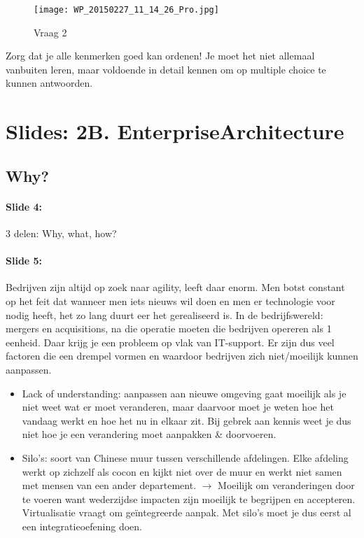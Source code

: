 \documentclass[10pt,a4paper]{report}
\begin{document}
\begin{figure}[ht!]
\centering
\texttt{[image: WP\_20150227\_11\_14\_26\_Pro.jpg]}
\caption{Vraag 2 \label{pop_Vraag 2}}
\end{figure}

Zorg dat je alle kenmerken goed kan ordenen! Je moet het niet allemaal vanbuiten leren, maar voldoende in detail kennen om op multiple choice te kunnen antwoorden. 

\section{Slides: 2B. EnterpriseArchitecture}
\subsection{Why?}
\paragraph{Slide 4:}3 delen: Why, what, how?

\paragraph{Slide 5:}Bedrijven zijn altijd op zoek naar agility, leeft daar enorm. Men botst constant op het feit dat wanneer men iets nieuws wil doen en men er technologie voor nodig heeft, het zo lang duurt eer het gerealiseerd is. In de bedrijfswereld: mergers en acquisitions, na die operatie moeten die bedrijven opereren als 1 eenheid. Daar krijg je een probleem op vlak van IT-support.
Er zijn dus veel factoren die een drempel vormen en waardoor bedrijven zich niet/moeilijk kunnen aanpassen.
\begin{itemize}
\item Lack of understanding: aanpassen aan nieuwe omgeving gaat moeilijk als je niet weet wat er moet veranderen, maar daarvoor moet je weten hoe het vandaag werkt en hoe het nu in elkaar zit. Bij gebrek aan kennis weet je dus niet hoe je een verandering moet aanpakken \& doorvoeren.
\item Silo's: soort van Chinese muur tussen verschillende afdelingen. Elke afdeling werkt op zichzelf als cocon en kijkt niet over de muur en werkt niet samen met mensen van een ander departement. $\rightarrow$ Moeilijk om veranderingen door te voeren want wederzijdse impacten zijn moeilijk te begrijpen en accepteren. Virtualisatie vraagt om geïntegreerde aanpak. Met silo's moet je dus eerst al een integratieoefening doen.
\end{itemize}
\end{document}
